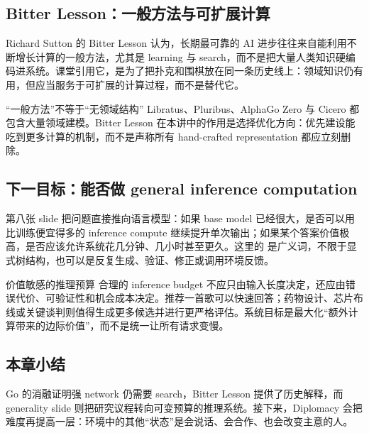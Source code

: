 \subsection{Bitter Lesson：一般方法与可扩展计算}

Richard Sutton 的 Bitter Lesson 认为，长期最可靠的 AI 进步往往来自能利用不断增长计算的一般方法，尤其是 learning 与 search，而不是把大量人类知识硬编码进系统。课堂引用它，是为了把扑克和围棋放在同一条历史线上：领域知识仍有用，但应当服务于可扩展的计算过程，而不是替代它。


\begin{warningbox}{“一般方法”不等于“无领域结构”}
Libratus、Pluribus、AlphaGo Zero 与 Cicero 都包含大量领域建模。Bitter Lesson 在本讲中的作用是选择优化方向：优先建设能吃到更多计算的机制，而不是声称所有 hand-crafted representation 都应立刻删除。
\end{warningbox}

\subsection{下一目标：能否做 general inference computation}

第八张 slide 把问题直接推向语言模型：如果 base model 已经很大，是否可以用比训练便宜得多的 inference compute 继续提升单次输出；如果某个答案价值极高，是否应该允许系统花几分钟、几小时甚至更久。这里的  是广义词，不限于显式树结构，也可以是反复生成、验证、修正或调用环境反馈。


\begin{importantbox}{价值敏感的推理预算}
合理的 inference budget 不应只由输入长度决定，还应由错误代价、可验证性和机会成本决定。推荐一首歌可以快速回答；药物设计、芯片布线或关键谈判则值得生成更多候选并进行更严格评估。系统目标是最大化“额外计算带来的边际价值”，而不是统一让所有请求变慢。
\end{importantbox}


\subsection{本章小结}

Go 的消融证明强 network 仍需要 search，Bitter Lesson 提供了历史解释，而 generality slide 则把研究议程转向可变预算的推理系统。接下来，Diplomacy 会把难度再提高一层：环境中的其他“状态”是会说话、会合作、也会改变主意的人。

